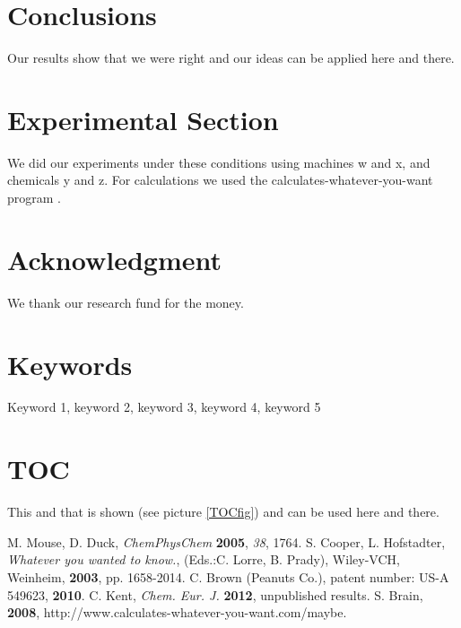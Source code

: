 \documentclass{article}
\begin{document}


\section{Conclusions}

Our results show that we were right and our ideas can be applied here and there.

\section{Experimental Section}

We did our experiments under these conditions using machines w and x, and chemicals y and z. For calculations we used the calculates-whatever-you-want program \cite{lite}.

\section{Acknowledgment}

We thank our research fund for the money.


\section{Keywords}

Keyword 1, keyword 2, keyword 3, keyword 4, keyword 5

\section{TOC}

This and that is shown (see picture \ref{TOCfig}) and can be used here and there.

\begin{thebibliography}{99}

 M. Mouse, D. Duck, {\em ChemPhysChem} {\bf 2005}, {\em 38}, 1764.
 S. Cooper, L. Hofstadter, {\em Whatever you wanted to know.}, (Eds.:C. Lorre, B. Prady), Wiley-VCH, Weinheim, {\bf 2003}, pp. 1658-2014.
 C. Brown (Peanuts Co.), patent number: US-A 549623, {\bf 2010}.
 C. Kent, {\em Chem. Eur. J.} {\bf 2012}, unpublished results.
 S. Brain, {\bf 2008}, http://www.calculates-whatever-you-want.com/maybe.

\end{thebibliography}
\end{document}
